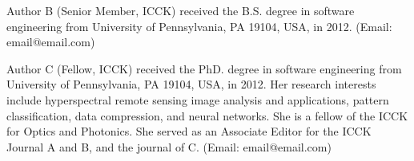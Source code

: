 \documentclass[twocolumn,proof]{ICCKjournal} %
\begin{document}
  \begin{biography}[author2]{Author B} (Senior Member, ICCK) received the B.S. degree in software engineering from University of Pennsylvania, PA 19104, USA, in 2012. (Email: email@email.com)
  \end{biography}

  \begin{biographynophoto}{Author C} (Fellow, ICCK) received the PhD. degree in software engineering from University of Pennsylvania, PA 19104, USA, in 2012. Her research interests include hyperspectral remote sensing image analysis and applications, pattern classification, data compression, and neural networks. She is a fellow of the ICCK for Optics and Photonics. She served as an Associate Editor for the ICCK Journal A and B, and the journal of C. (Email: email@email.com)
  \end{biographynophoto}

\else

\fi

\makeatother
\end{document}
